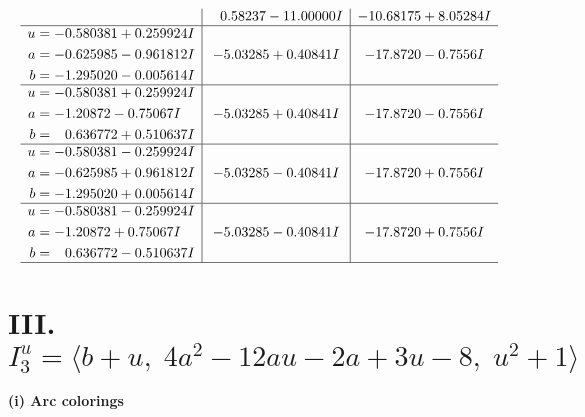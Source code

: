 \documentclass[1p]{elsarticle_modified}
\theoremstyle{definition}
\begin{document}
$$\begin{array}{c|c|c}
 & \phantom{-}0.58237 - 11.00000 I & -10.68175 + 8.05284 I \\ \hline\begin{aligned}
u &= -0.580381 + 0.259924 I \\
a &= -0.625985 - 0.961812 I \\
b &= -1.295020 - 0.005614 I\end{aligned}
 & -5.03285 + 0.40841 I & -17.8720 - 0.7556 I \\ \hline\begin{aligned}
u &= -0.580381 + 0.259924 I \\
a &= -1.20872 - 0.75067 I \\
b &= \phantom{-}0.636772 + 0.510637 I\end{aligned}
 & -5.03285 + 0.40841 I & -17.8720 - 0.7556 I \\ \hline\begin{aligned}
u &= -0.580381 - 0.259924 I \\
a &= -0.625985 + 0.961812 I \\
b &= -1.295020 + 0.005614 I\end{aligned}
 & -5.03285 - 0.40841 I & -17.8720 + 0.7556 I \\ \hline\begin{aligned}
u &= -0.580381 - 0.259924 I \\
a &= -1.20872 + 0.75067 I \\
b &= \phantom{-}0.636772 - 0.510637 I\end{aligned}
 & -5.03285 - 0.40841 I & -17.8720 + 0.7556 I\\
 \hline 
 \end{array}$$\newpage\newpage\renewcommand{\arraystretch}{1}
\centering \section*{III. $I^u_{3}= \langle b+u,\;4 a^2-12 a u-2 a+3 u-8,\;u^2+1 \rangle$}
\flushleft \textbf{(i) Arc colorings}\\
\end{document}
